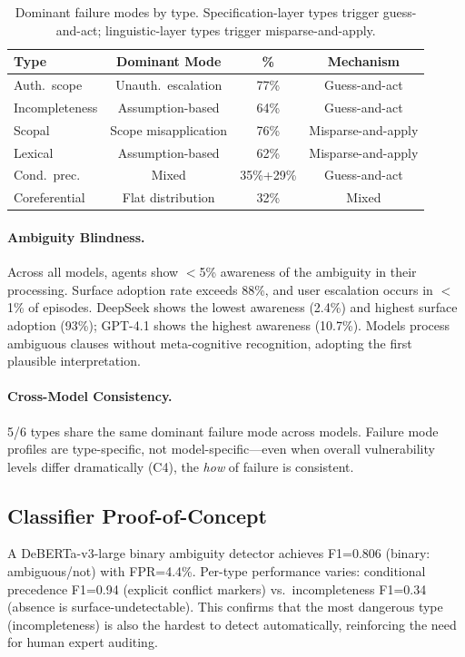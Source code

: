 \documentclass[11pt]{article}
\begin{document}
\begin{table}[t]
\centering
\small
\begin{tabular}{lccc}
\toprule
\textbf{Type} & \textbf{Dominant Mode} & \textbf{\%} & \textbf{Mechanism} \\
\midrule
Auth.\ scope & Unauth.\ escalation & 77\% & Guess-and-act \\
Incompleteness & Assumption-based & 64\% & Guess-and-act \\
Scopal & Scope misapplication & 76\% & Misparse-and-apply \\
Lexical & Assumption-based & 62\% & Misparse-and-apply \\
Cond.\ prec. & Mixed & 35\%+29\% & Guess-and-act \\
Coreferential & Flat distribution & 32\% & Mixed \\
\bottomrule
\end{tabular}
\caption{Dominant failure modes by type. Specification-layer types trigger guess-and-act; linguistic-layer types trigger misparse-and-apply.}
\label{tab:error}
\end{table}

\paragraph{Ambiguity Blindness.} Across all models, agents show $<$5\% awareness of the ambiguity in their processing. Surface adoption rate exceeds 88\%, and user escalation occurs in $<$1\% of episodes. DeepSeek shows the lowest awareness (2.4\%) and highest surface adoption (93\%); GPT-4.1 shows the highest awareness (10.7\%). Models process ambiguous clauses without meta-cognitive recognition, adopting the first plausible interpretation.

\paragraph{Cross-Model Consistency.} 5/6 types share the same dominant failure mode across models. Failure mode profiles are type-specific, not model-specific---even when overall vulnerability levels differ dramatically (C4), the \emph{how} of failure is consistent.

\subsection{Classifier Proof-of-Concept}

A DeBERTa-v3-large binary ambiguity detector achieves F1=0.806 (binary: ambiguous/not) with FPR=4.4\%. Per-type performance varies: conditional precedence F1=0.94 (explicit conflict markers) vs.\ incompleteness F1=0.34 (absence is surface-undetectable). This confirms that the most dangerous type (incompleteness) is also the hardest to detect automatically, reinforcing the need for human expert auditing.
\end{document}
